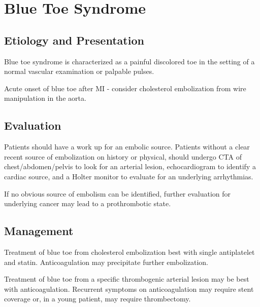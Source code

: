 \documentclass[
]{book}
\begin{document}
\hypertarget{blue-toe-syndrome}{%
\section{Blue Toe Syndrome}\label{blue-toe-syndrome}}

\hypertarget{etiology-and-presentation-1}{%
\subsection{Etiology and Presentation}\label{etiology-and-presentation-1}}

Blue toe syndrome is characterized as a painful discolored toe in the
setting of a normal vascular examination or palpable pulses.

Acute onset of blue toe after MI - consider cholesterol embolization
from wire manipulation in the aorta.
\citep{saricAorticAtherosclerosisEmbolic2012}

\hypertarget{evaluation-13}{%
\subsection{Evaluation}\label{evaluation-13}}

Patients should have a work up for an embolic source. Patients without a
clear recent source of embolization on history or physical, should
undergo CTA of chest/abdomen/pelvis to look for an arterial lesion,
echocardiogram to identify a cardiac source, and a Holter monitor to
evaluate for an underlying arrhythmias.

If no obvious source of embolism can be identified, further evaluation
for underlying cancer may lead to a prothrombotic state.

\hypertarget{management-20}{%
\subsection{Management}\label{management-20}}

Treatment of blue toe from cholesterol embolization best with single
antiplatelet and statin. Anticoagulation may precipitate further
embolization. \citep{ghahramaniPostproceduralBlueToes2016, quinonesCholesterolEmboliSyndrome2013}

Treatment of blue toe from a specific thrombogenic arterial lesion may
be best with anticoagulation. Recurrent symptoms on anticoagulation may
require stent coverage or, in a young patient, may require thrombectomy.
\citep{reyesvaldiviaAnticoagulationAloneAortic2017, jeyabalanEndovascularStrategiesTreatment2014, vermaContemporaryManagementSymptomatic2014}
\end{document}
